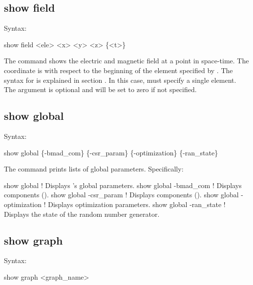 {{{{{{{{%

\subsection{show field}
\label{s:show.field}

Syntax:
\begin{example}
  show field <ele> <x> <y> <z> \{<t>\}
\end{example}

The  command shows the electric and magnetic field at a point in
space-time. The  coordinate is with respect to the beginning of the element
specified by . The syntax for  is explained in section
. In this case,  must specify a single element.
The  argument is optional and will be set to zero if not specified.


\subsection{show global}
\label{s:show.global}

Syntax:
\begin{example}
  show global \{-bmad_com\} \{-csr_param\} \{-optimization\} \{-ran_state\} 
\end{example}

The  command prints lists of global parameters. 
Specifically:
\begin{example}
  show global               ! Displays \tao's global parameters.
  show global -bmad_com     ! Displays  components ().
  show global -csr_param    ! Displays  components ().
  show global -optimization ! Displays optimization parameters.
  show global -ran_state    ! Displays the state of the random number generator.
\end{example}


\subsection{show graph}
\label{s:show.graph}

Syntax:
\begin{example}
  show graph <graph_name>
\end{example}

}}}}}}}}
